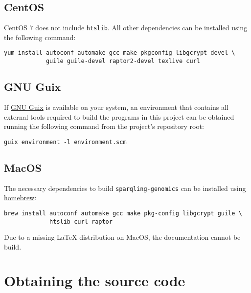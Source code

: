 \subsection{CentOS}

  CentOS 7 does not include \texttt{htslib}.  All other dependencies can
  be installed using the following command:

\begin{siderules}
\begin{verbatim}
yum install autoconf automake gcc make pkgconfig libgcrypt-devel \
            guile guile-devel raptor2-devel texlive curl
\end{verbatim}
\end{siderules}

\subsection{GNU Guix}

  If \href{https://www.gnu.org/software/guix}{GNU Guix} is available on your
  system, an environment that contains all external tools required to build
  the programs in this project can be obtained running the following command
  from the project's repository root:

\begin{siderules}
\begin{verbatim}
guix environment -l environment.scm
\end{verbatim}
\end{siderules}

\subsection{MacOS}

  The necessary dependencies to build \texttt{sparqling-genomics} can be
  installed using \href{https://brew.sh/}{homebrew}:

\begin{siderules}
\begin{verbatim}
brew install autoconf automake gcc make pkg-config libgcrypt guile \
             htslib curl raptor
\end{verbatim}
\end{siderules}

  Due to a missing \LaTeX{} distribution on MacOS, the documentation
  cannot be build.

\section{Obtaining the source code}
\label{sec:obtaining-tarball}

